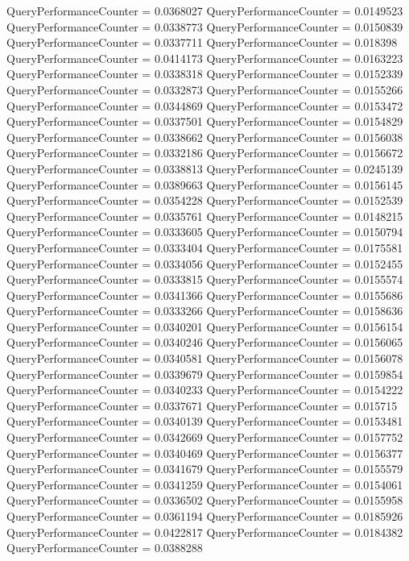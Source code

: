 \documentclass[9pt]{article}
\theoremstyle{plain}
\theoremstyle{definition}
\theoremstyle{remark}
\numberwithin{equation}{section}
\begin{document}
QueryPerformanceCounter  =  0.0368027
QueryPerformanceCounter  =  0.0149523
QueryPerformanceCounter  =  0.0338773
QueryPerformanceCounter  =  0.0150839
QueryPerformanceCounter  =  0.0337711
QueryPerformanceCounter  =  0.018398
QueryPerformanceCounter  =  0.0414173
QueryPerformanceCounter  =  0.0163223
QueryPerformanceCounter  =  0.0338318
QueryPerformanceCounter  =  0.0152339
QueryPerformanceCounter  =  0.0332873
QueryPerformanceCounter  =  0.0155266
QueryPerformanceCounter  =  0.0344869
QueryPerformanceCounter  =  0.0153472
QueryPerformanceCounter  =  0.0337501
QueryPerformanceCounter  =  0.0154829
QueryPerformanceCounter  =  0.0338662
QueryPerformanceCounter  =  0.0156038
QueryPerformanceCounter  =  0.0332186
QueryPerformanceCounter  =  0.0156672
QueryPerformanceCounter  =  0.0338813
QueryPerformanceCounter  =  0.0245139
QueryPerformanceCounter  =  0.0389663
QueryPerformanceCounter  =  0.0156145
QueryPerformanceCounter  =  0.0354228
QueryPerformanceCounter  =  0.0152539
QueryPerformanceCounter  =  0.0335761
QueryPerformanceCounter  =  0.0148215
QueryPerformanceCounter  =  0.0333605
QueryPerformanceCounter  =  0.0150794
QueryPerformanceCounter  =  0.0333404
QueryPerformanceCounter  =  0.0175581
QueryPerformanceCounter  =  0.0334056
QueryPerformanceCounter  =  0.0152455
QueryPerformanceCounter  =  0.0333815
QueryPerformanceCounter  =  0.0155574
QueryPerformanceCounter  =  0.0341366
QueryPerformanceCounter  =  0.0155686
QueryPerformanceCounter  =  0.0333266
QueryPerformanceCounter  =  0.0158636
QueryPerformanceCounter  =  0.0340201
QueryPerformanceCounter  =  0.0156154
QueryPerformanceCounter  =  0.0340246
QueryPerformanceCounter  =  0.0156065
QueryPerformanceCounter  =  0.0340581
QueryPerformanceCounter  =  0.0156078
QueryPerformanceCounter  =  0.0339679
QueryPerformanceCounter  =  0.0159854
QueryPerformanceCounter  =  0.0340233
QueryPerformanceCounter  =  0.0154222
QueryPerformanceCounter  =  0.0337671
QueryPerformanceCounter  =  0.015715
QueryPerformanceCounter  =  0.0340139
QueryPerformanceCounter  =  0.0153481
QueryPerformanceCounter  =  0.0342669
QueryPerformanceCounter  =  0.0157752
QueryPerformanceCounter  =  0.0340469
QueryPerformanceCounter  =  0.0156377
QueryPerformanceCounter  =  0.0341679
QueryPerformanceCounter  =  0.0155579
QueryPerformanceCounter  =  0.0341259
QueryPerformanceCounter  =  0.0154061
QueryPerformanceCounter  =  0.0336502
QueryPerformanceCounter  =  0.0155958
QueryPerformanceCounter  =  0.0361194
QueryPerformanceCounter  =  0.0185926
QueryPerformanceCounter  =  0.0422817
QueryPerformanceCounter  =  0.0184382
QueryPerformanceCounter  =  0.0388288
\end{document}
